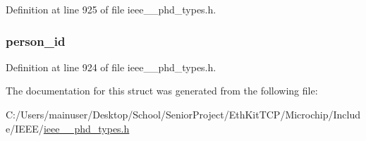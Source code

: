 Definition at line 925 of file ieee\+\_\+\_\+phd\+\_\+types.\+h.

\hypertarget{struct___scan_report_per_fixed_a508e6969c9e1531b94e99ea24031d53b}{}
\subsubsection[{person\+\_\+id}]{ person\+\_\+id}\label{struct___scan_report_per_fixed_a508e6969c9e1531b94e99ea24031d53b}


Definition at line 924 of file ieee\+\_\+\_\+phd\+\_\+types.\+h.



The documentation for this struct was generated from the following file\+:\begin{DoxyCompactItemize}
\item 
C\+:/\+Users/mainuser/\+Desktop/\+School/\+Senior\+Project/\+Eth\+Kit\+T\+C\+P/\+Microchip/\+Include/\+I\+E\+E\+E/\hyperlink{ieee__11073__phd__types_8h}{ieee\+\_\+\_\+phd\+\_\+types.\+h}\end{DoxyCompactItemize}
